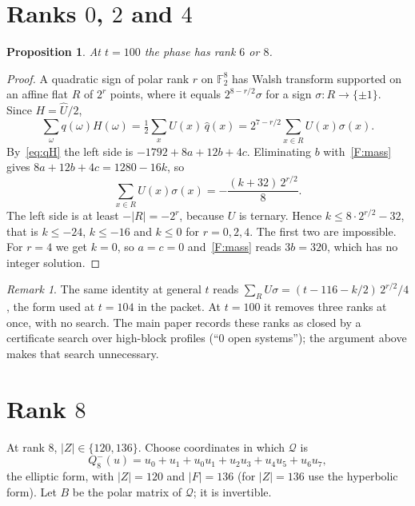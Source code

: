 \documentclass[11pt]{article}
\newtheorem{proposition}[theorem]{Proposition}
\theoremstyle{definition}
\theoremstyle{remark}
\newtheorem{remark}[theorem]{Remark}
\newcommand{\F}{\mathbb{F}}
\DeclareRobustCommand{\_}{\textunderscore\allowbreak}
\begin{document}
\section{Ranks $0$, $2$ and $4$}\label{sec:low}

\begin{proposition}\label{prop:low}
At $t=100$ the phase has rank $6$ or $8$.
\end{proposition}

\begin{proof}
A quadratic sign of polar rank $r$ on $\F_2^8$ has Walsh transform supported on an affine flat $R$ of $2^r$ points, where it equals $2^{8-r/2}\sigma$ for a sign $\sigma:R\to\{\pm1\}$. Since $H=\widehat U/2$,
\[
  \sum_\omega q(\omega)H(\omega)=\tfrac12\sum_x U(x)\,\widehat q(x)=2^{7-r/2}\sum_{x\in R}U(x)\sigma(x).
\]
By~\eqref{eq:qH} the left side is $-1792+8a+12b+4c$. Eliminating $b$ with~\ref{F:mass} gives $8a+12b+4c=1280-16k$, so
\[
  \sum_{x\in R}U(x)\sigma(x)=-\frac{(k+32)\,2^{r/2}}{8}.
\]
The left side is at least $-|R|=-2^r$, because $U$ is ternary. Hence $k\le 8\cdot2^{r/2}-32$, that is $k\le-24$, $k\le-16$ and $k\le0$ for $r=0,2,4$. The first two are impossible. For $r=4$ we get $k=0$, so $a=c=0$ and~\ref{F:mass} reads $3b=320$, which has no integer solution.
\end{proof}

\begin{remark}
The same identity at general $t$ reads $\sum_R U\sigma=(t-116-k/2)\,2^{r/2}/4$, the form used at $t=104$ in the packet. At $t=100$ it removes three ranks at once, with no search. The main paper records these ranks as closed by a certificate search over high-block profiles (``$0$ open systems''); the argument above makes that search unnecessary.
\end{remark}

\section{Rank $8$}\label{sec:r8}

At rank $8$, $|Z|\in\{120,136\}$. Choose coordinates in which $\mathcal Q$ is
\[
  Q_8^-(u)=u_0+u_1+u_0u_1+u_2u_3+u_4u_5+u_6u_7,
\]
the elliptic form, with $|Z|=120$ and $|F|=136$ (for $|Z|=136$ use the hyperbolic form). Let $B$ be the polar matrix of $\mathcal Q$; it is invertible.
\end{document}
